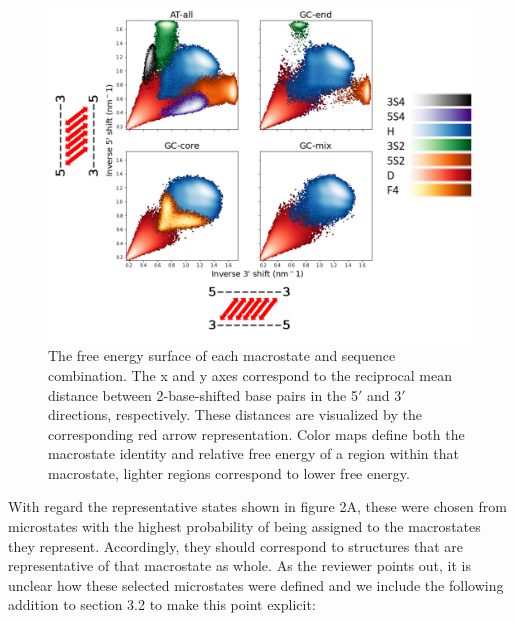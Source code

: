 \documentclass[11pt,a4paper]{letter} %
\begin{document}

\begin{figure}[ht!]
	\begin{center}
        \includegraphics[width=200mm]{cover_letter/revision_figures/macrostate_colors_FES.png}
        \caption{The free energy surface of each macrostate and sequence combination. The x and y axes correspond to the reciprocal mean distance between 2-base-shifted base pairs in the 5$\prime$ and 3$\prime$ directions, respectively. These distances are visualized by the corresponding red arrow representation. Color maps define both the macrostate identity and relative free energy of a region within that macrostate, lighter regions correspond to lower free energy.}
        \label{fig:macrostate_colors_FES}
	\end{center}
\end{figure}

With regard the representative states shown in figure 2A, these were chosen from microstates with the highest probability of being assigned to the macrostates they represent. Accordingly, they should correspond to structures  that are representative of that macrostate as whole. As the reviewer points out, it is unclear how these selected microstates were defined and we include the following addition to section 3.2 to make this point explicit:
\end{document}
